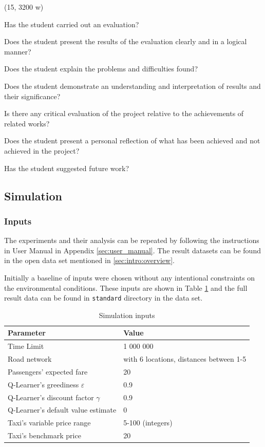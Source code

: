 (15, 3200 w)

Has the student carried out an evaluation?

Does the student present the results of the evaluation clearly and in a logical
manner?

Does the student explain the problems and difficulties found?

Does the student demonstrate an understanding and interpretation of results and
their significance?

Is there any critical evaluation of the project relative to the achievements of
related works?

Does the student present a personal reflection of what has been achieved and
not achieved in the project?

Has the student suggested future work?


\subsection{Simulation}
\label{sec:results}

\subsubsection{Inputs}

The experiments and their analysis can be repeated by following the
instructions in User Manual in Appendix \ref{sec:user_manual}. The result
datasets can be found in the open data set mentioned in
\ref{sec:intro:overview}.

Initially a baseline of inputs were chosen without any intentional constraints
on the environmental conditions. These inputs are shown in Table
\ref{table:input_data} and the full result data can be found in
\texttt{standard} directory in the data set.

\begin{table}
\begin{tabular}{ | l | l | }
  \hline
  Parameter & Value \\ \hline
  Time Limit & 1 000 000 \\
  Road network & with 6 locations, distances between 1-5 \\
  Passengers' expected fare & 20 \\
  Q-Learner's greediness \(\varepsilon\) & 0.9 \\
  Q-Learner's discount factor \(\gamma\) & 0.9 \\
  Q-Learner's default value estimate & 0 \\
  Taxi's variable price range & 5-100 (integers) \\
  Taxi's benchmark price & 20 \\
  \hline
\end{tabular}
\caption{
  Simulation inputs
  \label{table:input_data}
}
\end{table}

